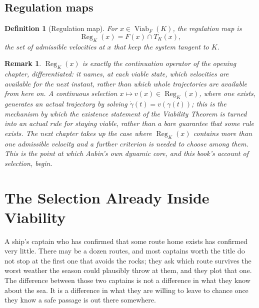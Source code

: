 \documentclass[11pt]{report}
\newtheorem{definition}{Definition}[chapter]
\newtheorem{remark}{Remark}[chapter]
\begin{document}
\section*{Regulation maps}

\begin{definition}[Regulation map]
For $x \in \operatorname{Viab}_F(K)$, the regulation map is
\[
\operatorname{Reg}_K(x) = F(x) \cap T_K(x),
\]
the set of admissible velocities at $x$ that keep the system tangent to
$K$.
\end{definition}

\begin{remark}
$\operatorname{Reg}_K(x)$ is exactly the continuation operator of the
opening chapter, differentiated: it names, at each viable state, which
velocities are available for the next instant, rather than which whole
trajectories are available from here on. A continuous selection
$x \mapsto v(x) \in \operatorname{Reg}_K(x)$, where one exists, generates
an actual trajectory by solving $\dot\gamma(t) = v(\gamma(t))$; this is
the mechanism by which the existence statement of the Viability Theorem
is turned into an actual rule for staying viable, rather than a bare
guarantee that some rule exists. The next chapter takes up the case
where $\operatorname{Reg}_K(x)$ contains more than one admissible
velocity and a further criterion is needed to choose among them. This is the
point at which Aubin's own dynamic core, and this book's account of
selection, begin.
\end{remark}

\chapter{The Selection Already Inside Viability}

A ship's captain who has confirmed that some route home exists has
confirmed very little. There may be a dozen routes, and most captains
worth the title do not stop at the first one that avoids the rocks;
they ask which route survives the worst weather the season could
plausibly throw at them, and they plot that one. The difference between
those two captains is not a difference in what they know about the
sea. It is a difference in what they are willing to leave to chance
once they know a safe passage is out there somewhere.
\end{document}
